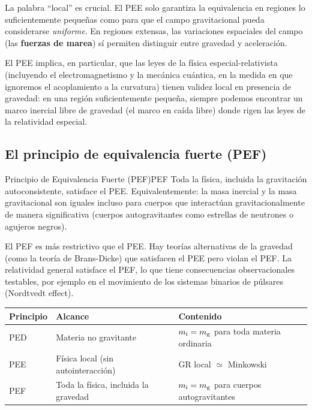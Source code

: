 \begin{importante}
La palabra ``local'' es crucial. El PEE solo garantiza la equivalencia en regiones lo suficientemente pequeñas como para que el campo gravitacional pueda considerarse \emph{uniforme}. En regiones extensas, las variaciones espaciales del campo (las \textbf{fuerzas de marea}) sí permiten distinguir entre gravedad y aceleración.
\end{importante}

El PEE implica, en particular, que las leyes de la física especial-relativista (incluyendo el electromagnetismo y la mecánica cuántica, en la medida en que ignoremos el acoplamiento a la curvatura) tienen validez local en presencia de gravedad: en una región suficientemente pequeña, siempre podemos encontrar un marco inercial libre de gravedad (el marco en caída libre) donde rigen las leyes de la relatividad especial.

\subsection{El principio de equivalencia fuerte (PEF)}

\begin{definicion}{Principio de Equivalencia Fuerte (PEF)}{PEF}
Toda la física, incluida la gravitación autoconsistente, satisface el PEE. Equivalentemente: la masa inercial y la masa gravitacional son iguales incluso para cuerpos que interactúan gravitacionalmente de manera significativa (cuerpos autogravitantes como estrellas de neutrones o agujeros negros).
\end{definicion}

El PEF es más restrictivo que el PEE. Hay teorías alternativas de la gravedad (como la teoría de Brans-Dicke) que satisfacen el PEE pero violan el PEF. La relatividad general satisface el PEF, lo que tiene consecuencias observacionales testables, por ejemplo en el movimiento de los sistemas binarios de púlsares (Nordtvedt effect).

\begin{center}
\renewcommand{\arraystretch}{1.5}
\begin{tabular}{lll}
\hline
\textbf{Principio} & \textbf{Alcance} & \textbf{Contenido} \\
\hline
PED & Materia no gravitante & $m_{\rm i} = m_{\rm g}$ para toda materia ordinaria \\
PEE & Física local (sin autointeracción) & GR local $\simeq$ Minkowski \\
PEF & Toda la física, incluida la gravedad & $m_{\rm i} = m_{\rm g}$ para cuerpos autogravitantes \\
\hline
\end{tabular}
\end{center}


